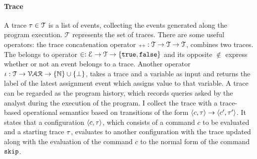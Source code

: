 \paragraph*{Trace}
A trace $\mathtt{\tau} \in \mathcal{T} $ is a list of events, 
collecting the events generated along the program execution. $\mathcal{T} $ represents the set of traces. There are some useful operators: the trace concatenation operator ${\scriptscriptstyle ++}: \mathcal{T} \to \mathcal{T} \to \mathcal{T}$, combines two traces.
The belongs to operator $\in : \mathcal{E} \to \mathcal{T} \to \{\mathtt{true}, \mathtt{false} \} $ and its opposite $\not\in$
express whether or not an event belongs to a trace.
Another operator $\iota : \mathcal{T} \to \mathcal{VAR} \to \{\mathbb{N}\}\cup \{\bot\}$,
takes a trace and a variable as input and returns the label of the latest assignment event which assigns value to that variable. 
%
A trace can be regarded as the program history, which records queries asked by the analyst during the execution of the program. I collect the trace with a trace-based operational semantics based on transitions of the form $ \langle c, \mathtt{\tau} \rangle \to \langle c', \mathtt{\tau}' \rangle $. It states that a configuration $\langle c, \mathtt{\tau} \rangle$, which consists of a command $c$ to be evaluated and a starting trace $\mathtt{\tau}$, evaluates to another configuration with the trace updated along with the evaluation of the command $c$ to the normal form of the command $\mathtt{skip}$.

